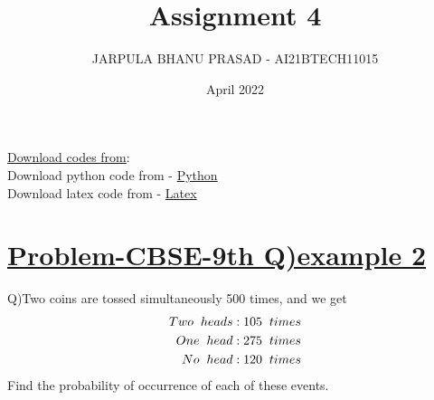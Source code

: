 \documentclass[journal,12pt,twocolumn]{IEEEtran}
\title{Assignment 4}
\author{JARPULA BHANU PRASAD - AI21BTECH11015}
\date{April 2022}
\begin{document}
\maketitle
\noindent \Large\underline{Download codes from}:\\
\noindent \large Download python code from - \href{https://github.com/jarpula-Bhanu/Assignment-4/blob/main/codes/probability.py}{Python}\\ Download latex code from - \href{https://github.com/jarpula-Bhanu/Assignment-4/blob/main/Assignment4.tex}{Latex}
\section{\large\underline{Problem-CBSE-9th Q)example 2}}
\large \noindent Q)Two coins are tossed simultaneously 500 times, and we get
\begin{align*}
Two \hspace{2mm} heads : 105 \hspace{2mm} times \\
One \hspace{2mm} head : 275 \hspace{2mm} times \\
No \hspace{2mm} head : 120 \hspace{2mm} times
\end{align*}
Find the probability of occurrence of each of these events.
\end{document}
